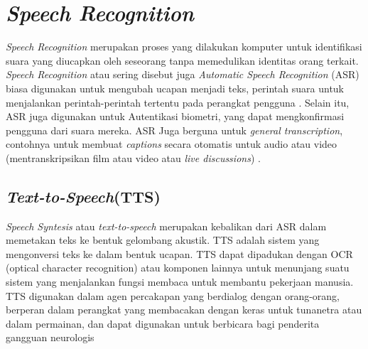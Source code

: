\newpage
\section{\textit{Speech Recognition}}
\textit{Speech Recognition} merupakan proses yang dilakukan komputer untuk identifikasi suara yang diucapkan oleh seseorang tanpa memedulikan identitas orang terkait. \textit{Speech Recognition} atau sering disebut juga \textit{Automatic Speech Recognition} (ASR) biasa digunakan untuk mengubah ucapan menjadi teks, perintah suara untuk menjalankan perintah-perintah tertentu pada perangkat pengguna \citep{mustikarini2019real}. Selain itu, ASR juga digunakan untuk Autentikasi biometri, yang dapat  mengkonfirmasi pengguna dari suara mereka. ASR Juga berguna untuk \textit{general transcription}, contohnya untuk membuat \textit{captions} secara otomatis untuk audio atau video (mentranskripsikan film atau video atau \textit{live discussions}) \citep{mustikarini2019real}. 


\subsection{\textit{Text-to-Speech}(TTS)}
\textit{Speech Syntesis} atau \textit{text-to-speech} merupakan kebalikan dari ASR dalam memetakan teks ke bentuk gelombang akustik. TTS adalah sistem yang mengonversi teks ke dalam bentuk ucapan. TTS dapat dipadukan dengan OCR (optical character recognition) atau komponen lainnya untuk menunjang suatu sistem yang menjalankan fungsi membaca untuk membantu pekerjaan manusia. TTS digunakan dalam agen percakapan yang berdialog dengan orang-orang, berperan dalam perangkat yang membacakan dengan keras untuk tunanetra atau dalam permainan, dan dapat digunakan untuk berbicara bagi penderita gangguan neurologis \citep{jonathan2020sintesis}



